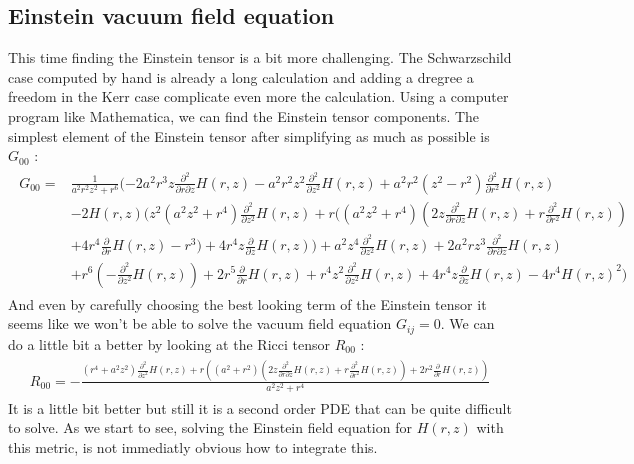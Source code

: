 \documentclass[a4paper,12pt]{article}
\theoremstyle{definition}
\begin{document}
\subsection{Einstein vacuum field equation}
This time finding the Einstein tensor is a bit more challenging.
The Schwarzschild case computed by hand is already a long calculation and adding a dregree a freedom in the Kerr case complicate even more the calculation.
Using a computer program like Mathematica, we can find the Einstein tensor components.
The simplest element of the Einstein tensor after simplifying as much as possible is $G_{00}$ :
\begin{align}
\begin{split}
	G_{00} = &\frac{1}{a^2 r^2z^2+r^6}(-2 a^2 r^3 z \frac{\partial^2}{\partial r\partial z}H(r,z)-a^2 r^2 z^2 \frac{\partial^2}{\partial z^2}H(r,z)+a^2 r^2(z^2-r^2) \frac{\partial^2}{\partial r^2}H(r,z)\\
	&-2 H(r,z) (z^2 (a^2z^2+r^4) \frac{\partial^2}{\partial z^2}H(r,z)+r ((a^2 z^2+r^4)(2 z \frac{\partial^2}{\partial r\partial z}H(r,z)+r \frac{\partial^2}{\partial r^2}H(r,z))\\
	&+4r^4\frac{\partial}{\partial r}H(r,z)-r^3)+4 r^4 z \frac{\partial}{\partial z}H(r,z))+a^2 z^4\frac{\partial^2}{\partial z^2}H(r,z)+2 a^2 r z^3 \frac{\partial^2}{\partial r\partial z}H(r,z)\\
	&+r^6(-\frac{\partial^2}{\partial z^2}H(r,z))+2 r^5 \frac{\partial}{\partial r}H(r,z)+r^4 z^2\frac{\partial^2}{\partial z^2}H(r,z)+4 r^4 z \frac{\partial}{\partial z}H(r,z)-4 r^4 H(r,z)^2)
\end{split}
\end{align}
And even by carefully choosing the best looking term of the Einstein tensor it seems like we won't be able to solve the vacuum field equation $G_{ij}=0$.
We can do a little bit a better by looking at the Ricci tensor $R_{00}$ :
\begin{align}
\begin{split}
	R_{00}=-\frac{(r^4+a^2z^2)\frac{\partial^2}{\partial z^2}H(r,z)+r
	((a^2+r^2) (2 z \frac{\partial^2}{\partial r\partial z}H(r,z)+r
	\frac{\partial^2}{\partial r^2}H(r,z))+2 r^2 \frac{\partial}{\partial r}H(r,z))}{a^2 z^2+r^4}
\end{split}
\end{align}
It is a little bit better but still it is a second order PDE that can be quite difficult to solve.
As we start to see, solving the Einstein field equation for $H(r,z)$ with this metric, is not immediatly obvious how to integrate this.
\end{document}
